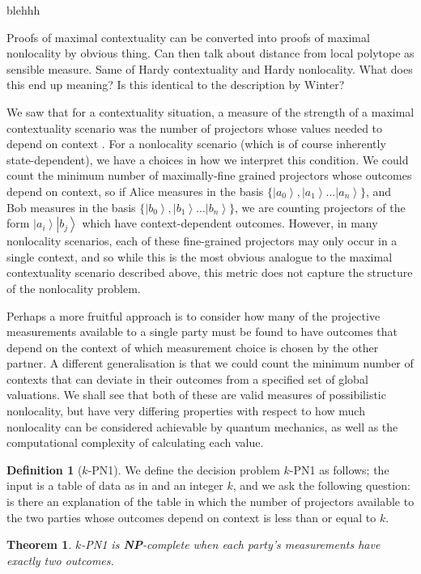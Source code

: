 \documentclass{amsart}
\newtheorem{thm}{Theorem}
\theoremstyle{definition}
\newtheorem{defn}{Definition}
\newcommand{\ket}[1]{{\left\vert{#1}\right\rangle}}
\begin{document}
blehhh

Proofs of maximal contextuality can be converted into proofs of maximal nonlocality by obvious thing. Can then talk about distance from local polytope as sensible measure. Same of Hardy contextuality and Hardy nonlocality.
What does this end up meaning? Is this identical to the description by Winter?

We saw that for a contextuality situation, a measure of the strength of a maximal contextuality scenario was the number of projectors whose values needed to depend on context . For a nonlocality scenario (which is of course inherently state-dependent), we have a choices in how we interpret this condition. We could count the minimum number of maximally-fine grained projectors whose outcomes depend on context, so if Alice measures in the basis $\{\ket{a_0},\ket{a_1}\dots\ket{a_n}\}$, and Bob measures in the basis $\{\ket{b_0},\ket{b_1}\dots\ket{b_n}\}$, we are counting projectors of the form $\ket{a_i}\ket{b_j}$ which have context-dependent outcomes. However, in many nonlocality scenarios, each of these fine-grained projectors may only occur in a single context, and so while this is the most obvious analogue to the maximal contextuality scenario described above, this metric does not capture the structure of the nonlocality problem.

Perhaps a more fruitful approach is to consider how many of the projective measurements available to a single party must be found to have outcomes that depend on the context of which measurement choice is chosen by the other partner. A different generalisation is that we could count the minimum number of contexts that can deviate in their outcomes from a specified set of global valuations. We shall see that both of these are valid measures of possibilistic nonlocality, but have very differing properties with respect to how much nonlocality can be considered achievable by quantum mechanics, as well as the computational complexity of calculating each value.

\begin{defn}[$k$-\textsc{PN1}]
We define the decision problem $k$-\textsc{PN1} as follows; the input is a table of data as in \cite{Mans2011} and an integer $k$, and we ask the following question: is there an explanation of the table in which the number of projectors available to the two parties whose outcomes depend on context is less than or equal to $k$.
\end{defn}
\begin{thm}$k$-\textsc{PN1} is \textbf{NP}-complete when each party's measurements have exactly two outcomes.
\end{thm}
\end{document}

